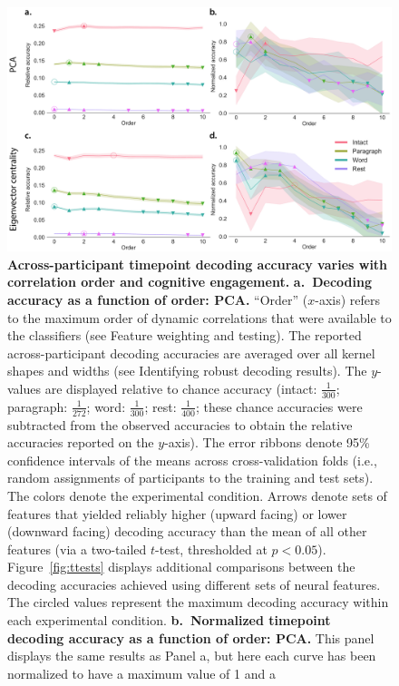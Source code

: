 \documentclass[english]{article}
\begin{document}
\begin{figure}[tp]
  \centering
  \includegraphics[width=\textwidth]{figs/decode_level}
  \caption{\textbf{Across-participant timepoint decoding accuracy varies with
       correlation order and cognitive engagement.}
     \textbf{a.~Decoding accuracy as a function of order: PCA.}
   ``Order'' ($x$-axis) refers to the maximum order of dynamic
    correlations that were available to the classifiers (see
    Feature weighting and testing).  The reported
    across-participant decoding accuracies are averaged over all
    kernel shapes and widths (see Identifying robust decoding
      results).  The $y$-values are displayed relative to chance
    accuracy (intact: $\frac{1}{300}$; paragraph: $\frac{1}{272}$;
    word: $\frac{1}{300}$; rest: $\frac{1}{400}$; these chance accuracies
    were subtracted from the observed accuracies to obtain the
    relative accuracies reported on the $y$-axis).  The error ribbons
    denote 95\% confidence intervals of the means across cross-validation folds
    (i.e., random assignments of participants to the training and test
    sets).  The colors denote the experimental condition.  Arrows
    denote sets of features that yielded reliably higher (upward
    facing) or lower (downward facing) decoding accuracy than the mean
    of all other features (via a two-tailed $t$-test, thresholded at
    $p < 0.05$).  Figure~\ref{fig:ttests} displays additional
    comparisons between the decoding accuracies achieved using
    different sets of neural features.  The circled values represent
    the maximum decoding accuracy within each experimental condition.
  \textbf{b.~Normalized timepoint decoding accuracy as a function of order:
       PCA.}  This panel displays the same results as Panel a, but here
    each curve has been normalized to have a maximum value of 1 and a
}
\end{figure}
\end{document}
